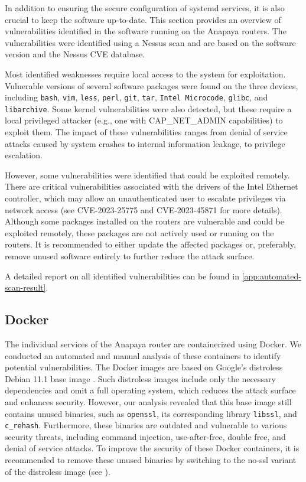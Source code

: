 In addition to ensuring the secure configuration of systemd services, it is also crucial to keep the software up-to-date.
This section provides an overview of vulnerabilities identified in the software running on the Anapaya routers.
The vulnerabilities were identified using a Nessus scan and are based on the software version and the Nessus CVE database.

Most identified weaknesses require local access to the system for exploitation.
Vulnerable versions of several software packages were found on the three devices, including \texttt{bash}, \texttt{vim}, \texttt{less}, \texttt{perl}, \texttt{git}, \texttt{tar}, \texttt{Intel Microcode}, \texttt{glibc}, and \texttt{libarchive}.
Some kernel vulnerabilities were also detected, but these require a local privileged attacker (e.g., one with CAP\_NET\_ADMIN capabilities) to exploit them.
The impact of these vulnerabilities ranges from denial of service attacks caused by system crashes to internal information leakage, to privilege escalation.

However, some vulnerabilities were identified that could be exploited remotely.
There are critical vulnerabilities associated with the drivers of the Intel Ethernet controller, which may allow an unauthenticated user to escalate privileges via network access (see CVE-2023-25775 and CVE-2023-45871 for more details).
Although some packages installed on the routers are vulnerable and could be exploited remotely, these packages are not actively used or running on the routers.
It is recommended to either update the affected packages or, preferably, remove unused software entirely to further reduce the attack surface.

A detailed report on all identified vulnerabilities can be found in \cref{app:automated-scan-result}.



\subsection{Docker}
\label{sec:docker}

The individual services of the Anapaya router are containerized using Docker.
We conducted an automated and manual analysis of these containers to identify potential vulnerabilities.
The Docker images are based on Google's distroless Debian 11.1 base image \cite{githubGitHubGoogleContainerToolsdistroless}.
Such distroless images include only the necessary dependencies and omit a full operating system, which reduces the attack surface and enhances security.
However, our analysis revealed that this base image still contains unused binaries, such as \texttt{openssl}, its corresponding library \texttt{libssl}, and \texttt{c\_rehash}.
Furthermore, these binaries are outdated and vulnerable to various security threats, including command injection, use-after-free, double free, and denial of service attacks.
To improve the security of these Docker containers, it is recommended to remove these unused binaries by switching to the no-ssl variant of the distroless image (see \cite{githubGitHubGoogleContainerToolsdistroless}).

